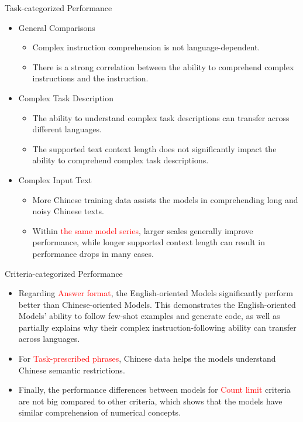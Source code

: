 \documentclass{beamer}
\begin{document}
\begin{frame}{Task-categorized Performance}
    \begin{itemize}
        \item {General Comparisons}
            \begin{itemize}
                \item {Complex instruction comprehension is not language-dependent.}
                \item {There is a strong correlation between the ability to comprehend complex instructions and the instruction.}
            \end{itemize}
        \item {Complex Task Description}
            \begin{itemize}
                \item {The ability to understand complex task descriptions can transfer across different languages.}
                \item {The supported text context length does not significantly impact the ability to comprehend complex task descriptions.}
            \end{itemize}
        \item {Complex Input Text}
            \begin{itemize}
                \item {More Chinese training data assists the models in comprehending long and noisy Chinese texts.}
                \item {Within \textcolor{red}{the same model series}, larger scales generally improve performance, while longer supported context length can result in performance drops in many cases.}
            \end{itemize}
    \end{itemize}
\end{frame}

\begin{frame}{Criteria-categorized Performance}
    \begin{itemize}
        \item {Regarding \textcolor{red}{Answer format}, the English-oriented Models significantly perform better than Chinese-oriented Models. This demonstrates the English-oriented Models' ability to follow few-shot examples and generate code, as well as partially explains why their complex instruction-following ability can transfer across languages.}
        \item {For \textcolor{red}{Task-prescribed phrases}, Chinese data helps the models understand Chinese semantic restrictions.}
        \item {Finally, the performance differences between models for \textcolor{red}{Count limit} criteria are not big compared to other criteria, which shows that the models have similar comprehension of numerical concepts.}
    \end{itemize}
\end{frame}
\end{document}
